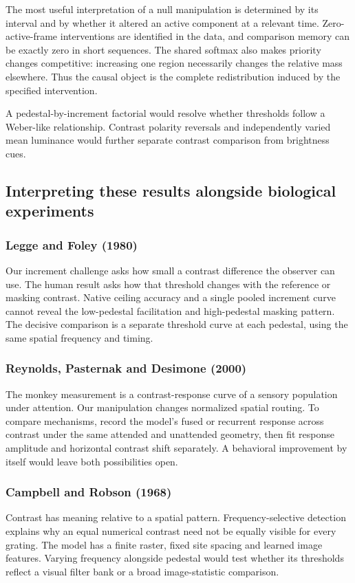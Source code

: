\documentclass[11pt]{article}
\begin{document}
The most useful interpretation of a null manipulation is determined by its interval and by whether it altered an active component at a relevant time. Zero-active-frame interventions are identified in the data, and comparison memory can be exactly zero in short sequences. The shared softmax also makes priority changes competitive: increasing one region necessarily changes the relative mass elsewhere. Thus the causal object is the complete redistribution induced by the specified intervention.

A pedestal-by-increment factorial would resolve whether thresholds follow a Weber-like relationship. Contrast polarity reversals and independently varied mean luminance would further separate contrast comparison from brightness cues.

\subsection{Interpreting these results alongside biological experiments}
\subsubsection{Legge and Foley (1980)}
Our increment challenge asks how small a contrast difference the observer can use. The human result asks how that threshold changes with the reference or masking contrast. Native ceiling accuracy and a single pooled increment curve cannot reveal the low-pedestal facilitation and high-pedestal masking pattern. The decisive comparison is a separate threshold curve at each pedestal, using the same spatial frequency and timing. \cite{bio_legge}

\subsubsection{Reynolds, Pasternak and Desimone (2000)}
The monkey measurement is a contrast-response curve of a sensory population under attention. Our manipulation changes normalized spatial routing. To compare mechanisms, record the model’s fused or recurrent response across contrast under the same attended and unattended geometry, then fit response amplitude and horizontal contrast shift separately. A behavioral improvement by itself would leave both possibilities open. \cite{bio_reynolds00}

\subsubsection{Campbell and Robson (1968)}
Contrast has meaning relative to a spatial pattern. Frequency-selective detection explains why an equal numerical contrast need not be equally visible for every grating. The model has a finite raster, fixed site spacing and learned image features. Varying frequency alongside pedestal would test whether its thresholds reflect a visual filter bank or a broad image-statistic comparison. \cite{bio_campbell}
\end{document}
